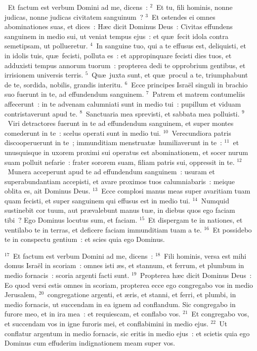 ~Et factum est verbum Domini ad me, dicens~:
${}^{2}$~Et tu, fili hominis, nonne judicas, nonne judicas civitatem sanguinum~?
${}^{3}$~Et ostendes ei omnes abominationes suas, et dices~: H\ae c dicit Dominus Deus~: Civitas effundens sanguinem in medio sui, ut veniat tempus ejus~: et qu\ae\ fecit idola contra semetipsam, ut pollueretur.
${}^{4}$~In sanguine tuo, qui a te effusus est, deliquisti, et in idolis tuis, qu\ae\ fecisti, polluta es~: et appropinquare fecisti dies tuos, et adduxisti tempus annorum tuorum~: propterea dedi te opprobrium gentibus, et irrisionem universis terris.
${}^{5}$~Qu\ae\ juxta sunt, et qu\ae\ procul a te, triumphabunt de te, sordida, nobilis, grandis interitu.
${}^{6}$~Ecce principes Isra\"el singuli in brachio suo fuerunt in te, ad effundendum sanguinem.
${}^{7}$~Patrem et matrem contumeliis affecerunt~: in te advenam calumniati sunt in medio tui~: pupillum et viduam contristaverunt apud te.
${}^{8}$~Sanctuaria mea sprevisti, et sabbata mea polluisti.
${}^{9}$~Viri detractores fuerunt in te ad effundendum sanguinem, et super montes comederunt in te~: scelus operati sunt in medio tui.
${}^{10}$~Verecundiora patris discooperuerunt in te~; immunditiam menstruat\ae\ humiliaverunt in te~:
${}^{11}$~et unusquisque in uxorem proximi sui operatus est abominationem, et socer nurum suam polluit nefarie~: frater sororem suam, filiam patris sui, oppressit in te.
${}^{12}$~Munera acceperunt apud te ad effundendum sanguinem~: usuram et superabundantiam accepisti, et avare proximos tuos calumniabaris~: meique oblita es, ait Dominus Deus.
${}^{13}$~Ecce complosi manus meas super avaritiam tuam quam fecisti, et super sanguinem qui effusus est in medio tui.
${}^{14}$~Numquid sustinebit cor tuum, aut pr\ae valebunt manus tu\ae , in diebus quos ego faciam tibi~? Ego Dominus locutus sum, et faciam.
${}^{15}$~Et dispergam te in nationes, et ventilabo te in terras, et deficere faciam immunditiam tuam a te.
${}^{16}$~Et possidebo te in conspectu gentium~: et scies quia ego Dominus.


${}^{17}$~Et factum est verbum Domini ad me, dicens~:
${}^{18}$~Fili hominis, versa est mihi domus Isra\"el in scoriam~: omnes isti \ae s, et stannum, et ferrum, et plumbum in medio fornacis~: scoria argenti facti sunt.
${}^{19}$~Propterea h\ae c dicit Dominus Deus~: Eo quod versi estis omnes in scoriam, propterea ecce ego congregabo vos in medio Jerusalem,
${}^{20}$~congregatione argenti, et \ae ris, et stanni, et ferri, et plumbi, in medio fornacis, ut succendam in ea ignem ad conflandum. Sic congregabo in furore meo, et in ira mea~: et requiescam, et conflabo vos.
${}^{21}$~Et congregabo vos, et succendam vos in igne furoris mei, et conflabimini in medio ejus.
${}^{22}$~Ut conflatur argentum in medio fornacis, sic eritis in medio ejus~: et scietis quia ego Dominus cum effuderim indignationem meam super vos.


